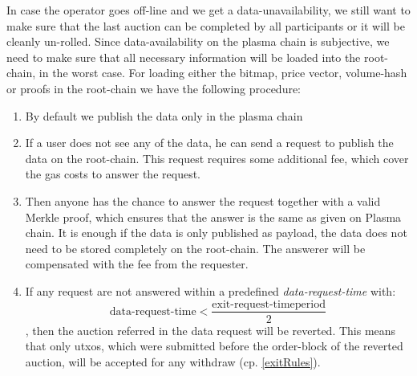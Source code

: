 \documentclass[11pt,parskip=full]{scrartcl}%
\begin{document}
\label{enforceAvailablity}
In case the operator goes off-line and we get a data-unavailability, we still want to make sure that the last auction can be completed by all participants or it will be cleanly un-rolled. 
Since data-availability on the plasma chain is subjective, we need to make sure that all necessary information will be loaded into the root-chain, in the worst case. \newline
For loading either the bitmap, price vector, volume-hash or proofs in the root-chain we have the following procedure:
\begin{enumerate}
\item By default we publish the data only in the plasma chain
\item If a user does not see any of the data, he can send a request to publish the data on the root-chain. This request requires some additional fee, which cover the gas costs to answer the request.
\item Then anyone has the chance to answer the request together with a valid Merkle proof, which ensures that the answer is the same as given on Plasma chain. It is enough if the data is only published as payload, the data does not need to be stored completely on the root-chain. The answerer will be compensated with the fee from the requester.
\item If any request are not answered within a predefined \emph{data-request-time} with: \begin{equation}
\text{data-request-time}< \frac{\text{exit-request-timeperiod}}{2}
\end{equation}, then the auction referred in the data request will be reverted.
This means that only utxos, which were submitted before the order-block of the reverted auction, will be accepted for any withdraw (cp. \ref{exitRules}). 
\end{enumerate}
\end{document}
